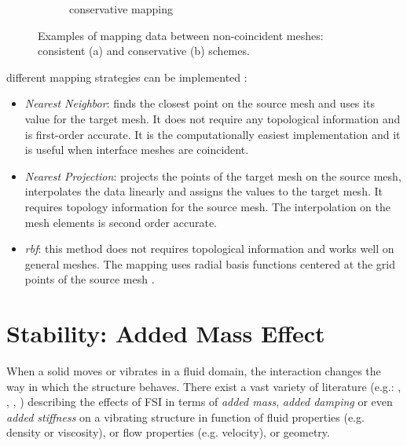 \begin{figure}[htbp!]
\begin{subfigure}{.8\textwidth}
		\caption{conservative mapping}
		\label{fig:conservative}
	\end{subfigure}
	\caption{Examples of mapping data between non-coincident meshes: consistent (a) and conservative (b) schemes.}
	\label{fig:mapping}
\end{figure}


different mapping strategies can be implemented \cite{bungartz2016precice}:

\begin{itemize}
	\item \textit{Nearest Neighbor}: finds the closest point on the source mesh and uses its value for the target mesh. It does not require any topological information and is first-order accurate. It is the computationally easiest implementation and it is useful when interface meshes are coincident.
	\item \textit{Nearest Projection}: projects the points of the target mesh on the source mesh, interpolates the data linearly and assigns the values to the target mesh. It requires topology information for the source mesh. The interpolation on the mesh elements is second order accurate.
	\item \textit{\acrfull{rbf}}: this method does not requires topological information and works well on general meshes. The mapping uses radial basis functions centered at the grid points of the source mesh \cite{lindner2017radial}.
\end{itemize}


\section{Stability: Added Mass Effect}
\label{sec:added-mass}

When a solid moves or vibrates in a fluid domain, the interaction changes the way in which the structure behaves. There exist a vast variety of literature (e.g.: \cite{chen1976added}, \cite{conca1997added}, \cite{gauthier2017numerical}, \cite{ricciardi2015modelling}) describing the effects of FSI in terms of \textit{added mass}, \textit{added damping} or even \textit{added stiffness} on a vibrating structure in function of fluid properties (e.g. density or viscosity), or flow properties (e.g. velocity), or geometry.

